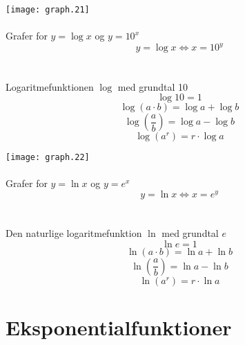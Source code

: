 \documentclass[11pt,a5paper,fleqn,leqno]{book}
\begin{document}
\texttt{[image: graph.21]}
\\
\\
Grafer for $y = \log x$ og $y = 10^x$
\begin{equation}
y = \log x \Leftrightarrow x = 10^y
\end{equation}
\\
\\
Logaritmefunktionen $\log$ med grundtal 10
\begin{equation}
\log 10 = 1
\end{equation}
\begin{equation}
\log(a \cdot b) = \log a + \log b
\end{equation}
\begin{equation}
\log\left(\frac{a}{b}\right) = \log a - \log b
\end{equation}
\begin{equation}
\log(a^r) = r \cdot \log a
\end{equation}

\newpage

\texttt{[image: graph.22]}
\\
\\
Grafer for $y = \ln x$ og $y = e^x$
\begin{equation}
y = \ln x \Leftrightarrow x = e^y
\end{equation}
\\
\\
Den naturlige logaritmefunktion $\ln$ med grundtal $e$
\begin{equation}
\ln e = 1
\end{equation}
\begin{equation}
\ln (a \cdot b) = \ln a + \ln b
\end{equation}
\begin{equation}
\ln\left(\frac{a}{b}\right) = \ln a - \ln b
\end{equation}
\begin{equation}
\ln(a^r) = r \cdot \ln a
\end{equation}

\newpage

\section{Eksponentialfunktioner}
\end{document}
